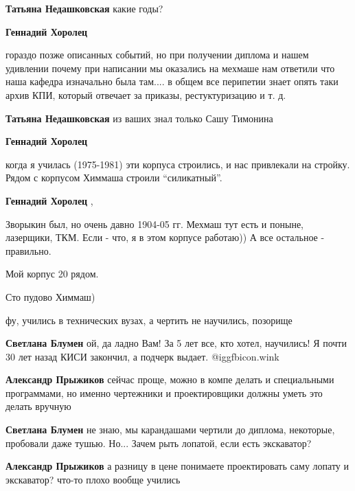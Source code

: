 \begin{itemize}
\begin{itemize}
\begin{itemize} %
\textbf{Татьяна Недашковская} какие годы?

\textbf{Геннадий Хоролец} 

гораздо позже описанных событий, но при получении диплома и нашем удивлении
почему при написании мы оказались на мехмаше нам ответили что наша кафедра
изначально была там.... в общем все перипетии знает опять таки архив КПИ,
который отвечает за приказы, рестуктуризацию и т. д.

\textbf{Татьяна Недашковская} из ваших знал только Сашу Тимонина
\end{itemize} %

\textbf{Геннадий Хоролец} 

когда я училась (1975-1981) эти корпуса строились, и нас привлекали на стройку.
Рядом с корпусом Химмаша строили \enquote{силикатный}.

\textbf{Геннадий Хоролец} , 

Зворыкин был, но очень давно 1904-05 гг. Мехмаш тут есть и поныне, лазерщики,
ТКМ. Если - что, я в этом корпусе работаю)) А все остальное - правильно.

\end{itemize} %

Мой корпус 20 рядом.

Сто пудово Химмаш)

фу, учились в технических вузах, а чертить не научились, позорище

\begin{itemize} %
\textbf{Светлана Блумен} ой, да ладно Вам! За 5 лет все, кто хотел, научились! Я почти 30 лет назад КИСИ закончил, а подчерк выдает.  @igg{fbicon.wink} 

\begin{itemize} %
\textbf{Александр Прыжиков} сейчас проще, можно в компе делать и специальными программами, но именно чертежники и проектировщики должны уметь это делать вручную

\textbf{Светлана Блумен} не знаю, мы карандашами чертили до диплома, некоторые, пробовали даже тушью. Но... Зачем рыть лопатой, если есть экскаватор?

\textbf{Александр Прыжиков} а разницу в цене понимаете проектировать саму лопату и экскаватор? что-то плохо вообще учились


\end{itemize}
\end{itemize}
\end{itemize}
